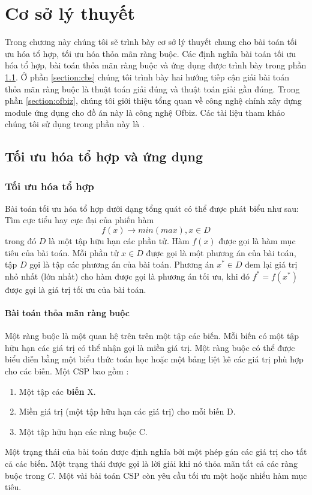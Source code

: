 \documentclass[a4paper,12pt]{report}
\begin{document}
\chapter{Cơ sở lý thuyết}
Trong chương này chúng tôi sẽ trình bày cơ sở lý thuyết chung cho bài toán tối ưu hóa tổ hợp, tối ưu hóa thỏa mãn ràng buộc. Các định nghĩa bài toán tối ưu hóa tổ hợp, bài toán thỏa mãn ràng buộc và ứng dụng được trình bày trong phần \ref{section:cbo}. Ở phần \ref{section:cbs} chúng tôi trình bày hai hướng tiếp cận giải bài toán thỏa mãn ràng buộc là thuật toán giải đúng và thuật toán giải gần đúng. Trong phần \ref{section:ofbiz}, chúng tôi giới thiệu tổng quan về công nghệ chính xây dựng module ứng dụng cho đồ án này là công nghệ Ofbiz. Các tài liệu tham khảo chúng tôi sử dụng trong phần này là \cite{TRR}\cite{AIAMAB}\cite{slidethayquang}\cite{csplib30} \cite{TUHTT}\cite{CBLS}\cite{DAA}\cite{HCP}\cite{GA}\cite{AOW}.
\section{Tối ưu hóa tổ hợp và ứng dụng}
\label{section:cbo}
\subsection{Tối ưu hóa tổ hợp}
Bài toán tối ưu hóa tổ hợp dưới dạng tổng quát có thể được phát biểu như sau: \\

Tìm cực tiểu hay cực đại của phiến hàm $$f(x)\rightarrow min(max), x \in D$$ trong đó $D$ là một tập hữu hạn các phần tử. Hàm $f(x)$ được gọi là hàm mục tiêu của bài toán. Mỗi phần tử $x\in D$ được gọi là một phương án của bài toán, tập $D$ gọi là tập các phương án của bài toán. Phương án $x^* \in D$ đem lại giá trị nhỏ nhất (lớn nhất) cho hàm được gọi là phương án tối ưu, khi đó $f^*=f(x^*)$ được gọi là giá trị tối ưu của bài toán\cite{TRR}.
\subsubsection{Bài toán thỏa mãn ràng buộc}
Một ràng buộc \cite{AIAMAB} \cite{slidethayquang} là một quan hệ trên trên một tập các biến. Mỗi biến có một tập hữu hạn các giá trị có thể nhận gọi là miền giá trị. Một ràng buộc có thể được biểu diễn bằng một biểu thức toán học hoặc một bảng liệt kê các giá trị phù hợp cho các biến. 
Một \ac{CSP} bao gồm : \begin{enumerate}
\item Một tập các \textbf{biến} X.
\item Miền giá trị (một tập hữu hạn các giá trị) cho mỗi biến D.
\item Một tập hữu hạn các ràng buộc C.
\end{enumerate}  
Một trạng thái của bài toán được định nghĩa bởi một phép gán các giá trị cho tất cả các biến. Một trạng thái được gọi là lời giải khi nó thỏa mãn tất cả các ràng buộc trong $C$. Một vài bài toán \ac{CSP} còn yêu cầu tối ưu một hoặc nhiểu hàm mục tiêu.  \\
\end{document}
